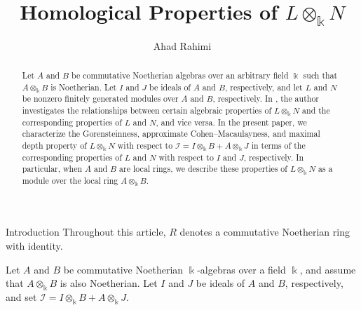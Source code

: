 \documentclass[10pt,a4paper]{amsart}
\makeatletter
\numberwithin{equation}{theorem}
\theoremstyle{definition}
\theoremstyle{fact}
\theoremstyle{conjecture}
\def\section{\@startsection{section}{1}%
\z@{.7\linespacing\@plus\linespacing}{.5\linespacing}%
{\normalfont\Large\bfseries\filcenter}}
\makeatother
\begin{document}
\author[Ahad Rahimi]
{Ahad Rahimi}

\title[Homological Properties of $L\otimes_{\Bbbk} N$]
{Homological Properties of $L\otimes_{\Bbbk} N$}

\address{A. Rahimi, Department of Mathematics, Razi University, Kermanshah, Iran.}




\begin{abstract}
Let $A$ and $B$ be commutative Noetherian algebras over an arbitrary field $\Bbbk$ such that $A\otimes_\Bbbk B$ is Noetherian.
 Let $I$ and $J$ be ideals of $A$ and $B$, respectively, and let $L$ and $N$ be nonzero finitely generated modules over $A$ and $B$, respectively.
  In \cite{R4}, the author investigates the relationships between certain algebraic properties of $L\otimes_\Bbbk N$ and
   the corresponding properties of $L$ and $N$, and vice versa. In the present paper, we characterize the Gorensteinness,
    approximate Cohen--Macaulayness, and maximal depth property of $L\otimes_\Bbbk N$ with respect
     to $\mathcal{I}=I\otimes_\Bbbk B+A\otimes_\Bbbk J$ in terms of the corresponding properties of $L$ and $N$ with respect to $I$ and $J$, respectively.
     In particular, when $A$ and $B$ are local rings, we describe these properties of $L \otimes_{\Bbbk} N$ as a module over the local ring $A \otimes_\Bbbk B$.
\end{abstract}

\maketitle

\tableofcontents

\section{Introduction}
Throughout this article, $R$ denotes a commutative Noetherian ring with identity.

Let $A$ and $B$ be commutative Noetherian $\Bbbk$-algebras over a field
$\Bbbk$, and assume that $A\otimes_\Bbbk B$ is also Noetherian.
Let $I$ and $J$ be ideals of $A$ and $B$, respectively, and set
$
\mathcal{I}=I\otimes_\Bbbk B+A\otimes_\Bbbk J.
$
\end{document}
